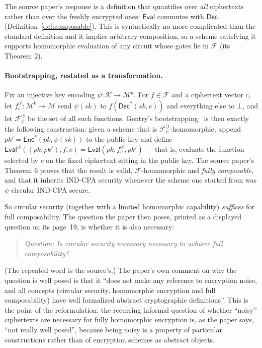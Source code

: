 \documentclass{aicr-conjecture}
\newcommand{\Enc}{\mathsf{Enc}}
\newcommand{\Dec}{\mathsf{Dec}}
\newcommand{\Eval}{\mathsf{Eval}}
\newcommand{\Msp}{\mathcal{M}}
\newcommand{\Ksp}{\mathcal{K}}
\newcommand{\Fset}{\mathcal{F}}
\begin{document}
The source paper's response is a definition that quantifies over
\emph{all} ciphertexts rather than over the freshly encrypted ones:
$\Eval$ commutes with $\Dec$ (Definition~\ref{def:composable}). This is
syntactically no more complicated than the standard definition and it
implies arbitrary composition, so a scheme satisfying it supports
homomorphic evaluation of any circuit whose gates lie in $\Fset$ (its
Theorem 2).

\paragraph{Bootstrapping, restated as a transformation.}
Fix an injective key encoding $\psi : \Ksp \to \Msp^{k}$. For $f \in
\Fset$ and a ciphertext vector $c$, let $f^{\circlearrowleft}_{c} :
\Msp^{k} \to \Msp$ send $\psi(sk)$ to $f(\Dec^{*}(sk, c))$ and
everything else to $\bot$, and let
$\Fset^{\circlearrowleft}_{\psi}$ be the set of all such functions.
Gentry's bootstrapping~\cite{Gen09} is then exactly the following
construction: given a scheme that is
$\Fset^{\circlearrowleft}_{\psi}$-homomorphic, append
$pk' = \Enc^{*}(pk, \psi(sk))$ to the public key and define
$\Eval^{\circlearrowleft}((pk, pk'), f, c) = \Eval(pk,
f^{\circlearrowleft}_{c}, pk')$ --- that is, evaluate the function
selected by $c$ on the fixed ciphertext sitting in the public key. The
source paper's Theorem 6 proves that the result is valid,
$\Fset$-homomorphic and \emph{fully composable}, and that it inherits
IND-CPA security whenever the scheme one started from was $\psi$-circular
IND-CPA secure.

So circular security (together with a limited homomorphic capability)
\emph{suffices} for full composability. The question the paper then
poses, printed as a displayed question on its page~19, is whether it is
also necessary:

\begin{quote}
\itshape Question: Is circular security necessary necessary to achieve
full composability?
\end{quote}

\noindent
(The repeated word is the source's.) The paper's own comment on why the
question is well posed is that it ``does not make any reference to
encryption noise, and all concepts (circular security, homomorphic
encryption and full composability) have well formalized abstract
cryptographic definitions''. This is the point of the reformulation:
the recurring informal question of whether ``noisy'' ciphertexts are
necessary for fully homomorphic encryption is, as the paper says, ``not
really well posed'', because being noisy is a property of particular
constructions rather than of encryption schemes as abstract objects.
\end{document}
